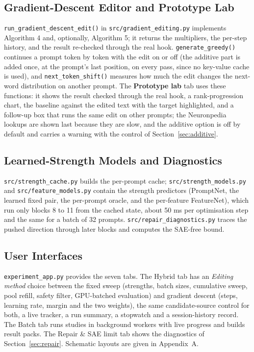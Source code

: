 \documentclass[12pt,a4paper]{report}
\begin{document}
\subsection{Gradient-Descent Editor and Prototype Lab}

\texttt{run\_\allowbreak{}gradient\_\allowbreak{}descent\_\allowbreak{}edit()} in \texttt{src/\allowbreak{}gradient\_\allowbreak{}editing.\allowbreak{}py} implements Algorithm 4 and, optionally, Algorithm 5; it returns the multipliers, the per-step history, and the result re-checked through the real hook. \texttt{generate\_\allowbreak{}greedy()} continues a prompt token by token with the edit on or off (the additive part is added once, at the prompt's last position, on every pass, since no key-value cache is used), and \texttt{next\_\allowbreak{}token\_\allowbreak{}shift()} measures how much the edit changes the next-word distribution on another prompt. The \textbf{Prototype lab} tab uses these functions: it shows the result checked through the real hook, a rank-progression chart, the baseline against the edited text with the target highlighted, and a follow-up box that runs the same edit on other prompts; the Neuronpedia lookups are shown last because they are slow, and the additive option is off by default and carries a warning with the control of Section~\ref{sec:additive}.

\subsection{Learned-Strength Models and Diagnostics}

\texttt{src/\allowbreak{}strength\_\allowbreak{}cache.\allowbreak{}py} builds the per-prompt cache; \texttt{src/\allowbreak{}strength\_\allowbreak{}models.\allowbreak{}py} and \texttt{src/\allowbreak{}feature\_\allowbreak{}models.\allowbreak{}py} contain the strength predictors (PromptNet, the learned fixed pair, the per-prompt oracle, and the per-feature FeatureNet), which run only blocks 8 to 11 from the cached state, about 50 ms per optimisation step and the same for a batch of 32 prompts. \texttt{src/\allowbreak{}repair\_\allowbreak{}diagnostics.\allowbreak{}py} traces the pushed direction through later blocks and computes the SAE-free bound.

\subsection{User Interfaces}

\texttt{experiment\_\allowbreak{}app.\allowbreak{}py} provides the seven tabs. The Hybrid tab has an \textit{Editing method} choice between the fixed sweep (strengths, batch sizes, cumulative sweep, pool refill, safety filter, GPU-batched evaluation) and gradient descent (steps, learning rate, margin and the two weights), the same candidate-source control for both, a live tracker, a run summary, a stopwatch and a session-history record. The Batch tab runs studies in background workers with live progress and builds result packs. The Repair \& SAE limit tab shows the diagnostics of Section~\ref{sec:repair}. Schematic layouts are given in Appendix~A.
\end{document}
